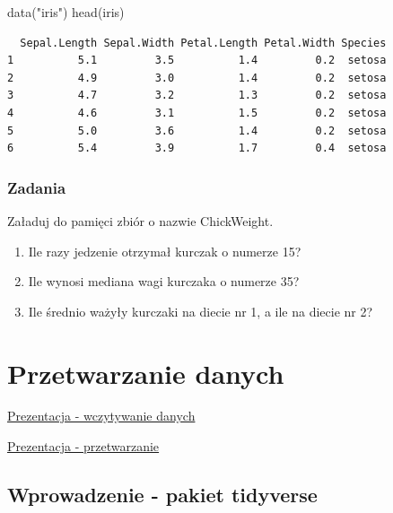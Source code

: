 \documentclass[
  letterpaper,
  DIV=11,
  numbers=noendperiod]{scrreprt}
\newenvironment{Shaded}{\begin{snugshade}}{\end{snugshade}}
\newcommand{\FunctionTok}[1]{\textcolor[rgb]{0.28,0.35,0.67}{#1}}
\newcommand{\NormalTok}[1]{\textcolor[rgb]{0.00,0.23,0.31}{#1}}
\newcommand{\StringTok}[1]{\textcolor[rgb]{0.13,0.47,0.30}{#1}}
\providecommand{\tightlist}{%
  \setlength{\itemsep}{0pt}\setlength{\parskip}{0pt}}\usepackage{longtable,booktabs,array}
\begin{document}
\begin{Shaded}
\begin{Highlighting}[]
\FunctionTok{data}\NormalTok{(}\StringTok{"iris"}\NormalTok{)}
\FunctionTok{head}\NormalTok{(iris)}
\end{Highlighting}
\end{Shaded}

\begin{verbatim}
  Sepal.Length Sepal.Width Petal.Length Petal.Width Species
1          5.1         3.5          1.4         0.2  setosa
2          4.9         3.0          1.4         0.2  setosa
3          4.7         3.2          1.3         0.2  setosa
4          4.6         3.1          1.5         0.2  setosa
5          5.0         3.6          1.4         0.2  setosa
6          5.4         3.9          1.7         0.4  setosa
\end{verbatim}

\hypertarget{zadania-1}{%
\subsection{Zadania}\label{zadania-1}}

Załaduj do pamięci zbiór o nazwie ChickWeight.

\begin{enumerate}
\def\labelenumi{\arabic{enumi}.}
\tightlist
\item
  Ile razy jedzenie otrzymał kurczak o numerze 15?
\item
  Ile wynosi mediana wagi kurczaka o numerze 35?
\item
  Ile średnio ważyły kurczaki na diecie nr 1, a ile na diecie nr 2?
\end{enumerate}


\hypertarget{przetwarzanie-danych}{%
\chapter{Przetwarzanie danych}\label{przetwarzanie-danych}}

\href{presentations/02_wczytywanie.html}{Prezentacja - wczytywanie
danych}

\href{presentations/03_przetwarzanie.html}{Prezentacja - przetwarzanie}

\hypertarget{wprowadzenie---pakiet-tidyverse}{%
\section{Wprowadzenie - pakiet
tidyverse}\label{wprowadzenie---pakiet-tidyverse}}
\end{document}
